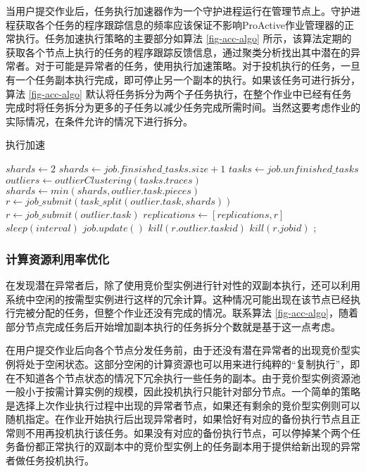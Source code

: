 当用户提交作业后，任务执行加速器作为一个守护进程运行在管理节点上。守护进程获取各个任务的程序跟踪信息的频率应该保证不影响ProActive作业管理器的正常执行。任务加速执行策略的主要部分如算法 \ref{fig-acc-algo} 所示，该算法定期的获取各个节点上执行的任务的程序跟踪反馈信息，通过聚类分析找出其中潜在的异常者。对于可能是异常者的任务，使用执行加速策略。对于投机执行的任务，一旦有一个任务副本执行完成，即可停止另一个副本的执行。如果该任务可进行拆分，算法 \ref{fig-acc-algo} 默认将任务拆分为两个子任务执行，在整个作业中已经有任务完成时将任务拆分为更多的子任务以减少任务完成所需时间。当然这要考虑作业的实际情况，在条件允许的情况下进行拆分。
\begin{algorithm}
\caption{执行加速}
\label{fig-acc-algo}
$shards\gets 2$\;
{
  {
    $shards\gets job.finsished\_tasks.size + 1$\;
  }
  $tasks\gets job.unfinished\_tasks$\;
  $outliers\gets outlierClustering(tasks.traces)$\;
  {
    {
      {
        $shards\gets min(shards, outlier.task.pieces)$\;
        $r\gets job\_submit(task\_split(outlier.task, shards))$\;
      }{
        $r\gets job\_submit(outlier.task)$\;
      }
      $replications\gets [replications, r]$\;
    }
  }
  $sleep(interval)$\;
  $job.update()$\;
  {
    {
      $kill(r.outlier.taskid)$\;
    }
    {
      $kill(r.jobid)$\;
    }
  }
}
;
\end{algorithm}

\subsubsection{计算资源利用率优化}
在发现潜在异常者后，除了使用竞价型实例进行针对性的双副本执行，还可以利用系统中空闲的按需型实例进行这样的冗余计算。这种情况可能出现在该节点已经执行完被分配的任务，但整个作业还没有完成的情况。联系算法 \ref{fig-acc-algo}，随着部分节点完成任务后开始增加副本执行的任务拆分个数就是基于这一点考虑。

在用户提交作业后向各个节点分发任务前，由于还没有潜在异常者的出现竞价型实例将处于空闲状态。这部分空闲的计算资源也可以用来进行纯粹的``复制执行''，即在不知道各个节点状态的情况下冗余执行一些任务的副本。由于竞价型实例资源池一般小于按需计算实例的规模，因此投机执行只能针对部分节点。一个简单的策略是选择上次作业执行过程中出现的异常者节点，如果还有剩余的竞价型实例则可以随机指定。在作业开始执行后出现异常者时，如果恰好有对应的备份执行节点且正常则不用再投机执行该任务。如果没有对应的备份执行节点，可以停掉某个两个任务备份都正常执行的双副本中的竞价型实例上的任务副本用于提供给新出现的异常者做任务投机执行。

